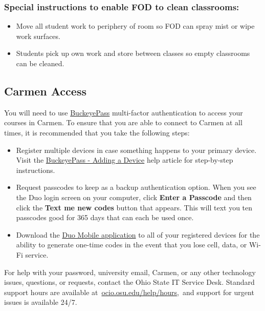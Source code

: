 \subsubsection{Special instructions to enable FOD to clean classrooms:}
\begin{itemize}
      \tightlist
      \item Move all student work to periphery of room so FOD can spray mist or wipe work surfaces.
      \item Students pick up own work and store between classes so empty classrooms can be cleaned.
\end{itemize}

\subsection{Carmen Access}

You will need to use \href{https://buckeyepass.osu.edu/}{BuckeyePass} multi-factor authentication to access your courses in Carmen. To ensure that you are able to connect to Carmen at all times, it is recommended that you take the following steps:

\begin{itemize}
      \item
            Register multiple devices in case something happens to your primary device. Visit the \href{https://osuitsm.service-now.com/selfservice/kb_view.do?sysparm_article=kb05025}{BuckeyePass - Adding a Device} help article for step-by-step instructions.
      \item
            Request passcodes to keep as a backup authentication option. When you see the Duo login screen on your computer, click \textbf{Enter a Passcode} and then click the \textbf{Text me new codes} button that appears. This will text you ten passcodes good for 365 days that can each be used once.
      \item
            Download the \href{https://osuitsm.service-now.com/selfservice/kb_view.do?sysparm_article=kb05026}{Duo Mobile application} to all of your registered devices for the ability to generate one-time codes in the event that you lose cell, data, or Wi-Fi service.
\end{itemize}

For help with your password, university email, Carmen, or any other technology issues, questions, or requests, contact the Ohio State IT Service Desk. Standard support hours are available at~\href{https://ocio.osu.edu/help/hours}{ocio.osu.edu/help/hours},~and support for urgent issues is available 24/7.

